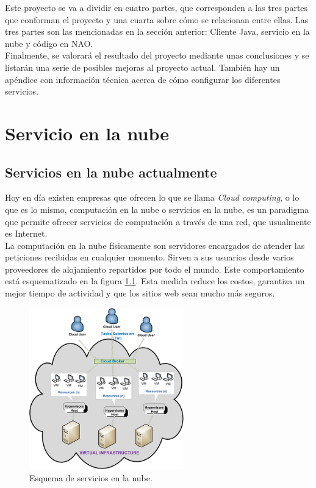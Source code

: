 \documentclass[12pt,spanish,listoffigures,listoftables]{tfgetsinf}
\begin{document}
Este proyecto se va a dividir en cuatro partes, que corresponden a las tres partes que conforman el proyecto y una cuarta sobre cómo se relacionan entre ellas. Las tres partes son las mencionadas en la sección anterior: Cliente Java, servicio en la nube y código en NAO. \\

Finalmente, se valorará el resultado del proyecto mediante unas conclusiones y se listarán una serie de posibles mejoras al proyecto actual. También hay un apéndice con información técnica acerca de cómo configurar los diferentes servicios.


\chapter{Servicio en la nube}

\section{Servicios en la nube actualmente}

Hoy en día existen empresas que ofrecen lo que se llama \textit{Cloud computing}, o lo que es lo mismo, computación en la nube o servicios en la nube, es un paradigma que permite ofrecer servicios de computación a través de una red, que usualmente es Internet. \\

La computación en la nube físicamente son servidores encargados de atender las peticiones recibidas en cualquier momento. Sirven a sus usuarios desde varios proveedores de alojamiento repartidos por todo el mundo. Este comportamiento está esquematizado en la figura \ref{figura:cloudcomputescheme}. Esta medida reduce los costos, garantiza un mejor tiempo de actividad y que los sitios web sean mucho más seguros. \\

\begin{figure}[!h]
	\centering
	\includegraphics[height=7cm]{img/cloudcompute}
	\caption{Esquema de servicios en la nube.}
	\label{figura:cloudcomputescheme}
\end{figure}
\end{document}
